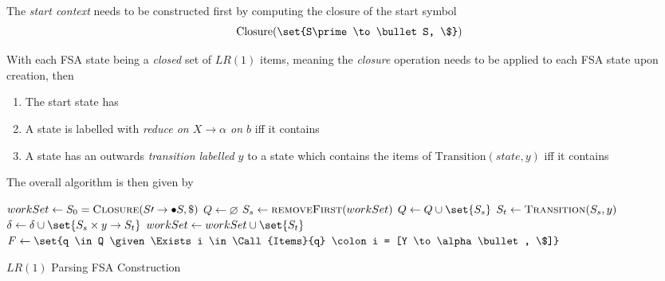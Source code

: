 \begin{definition}
    The \textit{start context} needs to be constructed first by computing the closure of the start symbol
    \begin{equation}
        \mathrm{Closure}(\set{S\prime \to \bullet S, \$})
    \end{equation}
    
    With each FSA state being a \textit{closed} set of $LR(1)$ items, meaning the \textit{closure} operation needs to be applied to each FSA state upon creation, then
    \begin{enumerate}
        \item The start state has
        \begin{equation}
            [S\prime \to \bullet S, \$]
        \end{equation}
        \item A state is labelled with \textit{reduce on $X \to \alpha$ on $b$} iff it contains
        \begin{equation}
            [X \to \beta \bullet, b]
        \end{equation}
        \item A state has an outwards \textit{transition labelled $y$} to a state which contains the items of $\mathrm{Transition}(state, y)$ iff it contains
        \begin{equation}
            [X \to A \bullet \gamma\ \beta, b]
        \end{equation}
    \end{enumerate}
    
    The overall algorithm is then given by
    \begin{algorithm}[H]
        \begin{algorithmic}[1]
                \State $workSet \gets S_0 = \Call{Closure}{S\prime \to \bullet S, \$}$
                \State $Q \gets \varnothing$
                    \State $S_s \gets \Call{removeFirst}{workSet}$
                    \State $Q \gets Q \cup \set{S_s}$
                        \State $S_t \gets \Call{Transition}{S_s, y}$
                        \State $\delta \gets \delta \cup \set{S_s \times y \to S_t}$
                            \State $workSet \gets workSet \cup \set{S_t}$
                        \EndIf
                    \EndFor
                \EndWhile
                \State $F \gets \set{q \in Q \given \Exists i \in \Call{Items}{q} \colon i = [Y \to \alpha \bullet, \$]}$
                \State {}
            \EndProcedure
        \end{algorithmic}
        \caption{$LR(1)$ Parsing FSA Construction}
        \label{prog:lr1-fsa-construction}
    \end{algorithm}
\end{definition}

